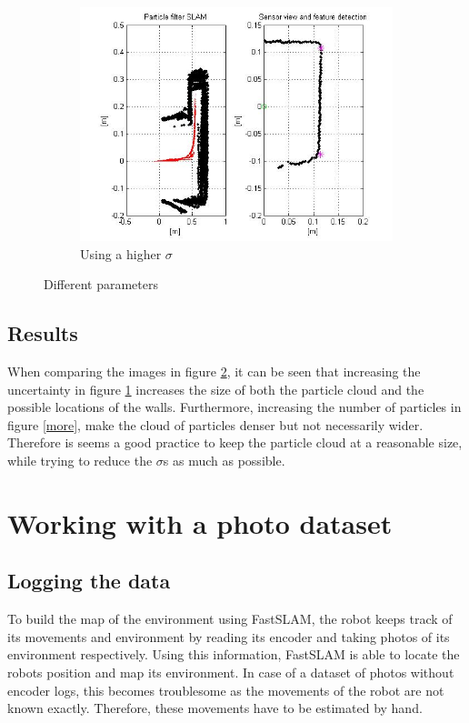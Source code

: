 \documentclass[12pt]{article}
\begin{document}
\begin{figure}[H]
\begin{subfigure}[b]{0.48\textwidth}
	\end{subfigure}
	~
	\begin{subfigure}[b]{0.48\textwidth}
		\includegraphics[width=\textwidth]{sigma_chance.jpg}
		\caption{Using a higher $\sigma$}
		\label{sigma}
	\end{subfigure}
	\caption{Different parameters}
	\label{fig:tweaks}
\end{figure}

\subsection{Results}
When comparing the images in figure \ref{fig:tweaks}, it can be seen that increasing the uncertainty in figure \ref{sigma} increases the size of both the particle cloud and the possible locations of the walls. Furthermore, increasing the number of particles in figure \ref{more}, make the cloud of particles denser but not necessarily wider. Therefore is seems a good practice to keep the particle cloud at a reasonable size, while trying to reduce the $\sigma$s as much as possible. 

\section{Working with a photo dataset}
\subsection{Logging the data}
To build the map of the environment using FastSLAM, the robot keeps track of its movements and environment by reading its encoder and taking photos of its environment respectively. Using this information, FastSLAM is able to locate the robots position and map its environment. In case of a dataset of photos without encoder logs, this becomes troublesome as the movements of the robot are not known exactly. Therefore, these movements have to be estimated by hand.
\end{document}
